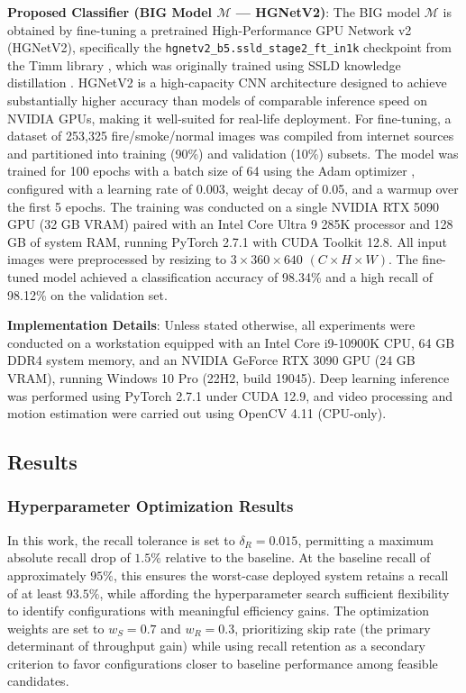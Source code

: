 \documentclass[
  10pt,
]{article}
\begin{document}
\textbf{Proposed Classifier (BIG Model \(\mathcal{M}\) --- HGNetV2)}:
The BIG model \(\mathcal{M}\) is obtained by fine-tuning a pretrained
High-Performance GPU Network v2 (HGNetV2), specifically the
\texttt{hgnetv2\_b5.ssld\_stage2\_ft\_in1k} checkpoint
 from the Timm library
, which was originally trained using
SSLD knowledge distillation .
HGNetV2  is a
high-capacity CNN architecture designed to achieve substantially higher
accuracy than models of comparable inference speed on NVIDIA GPUs,
making it well-suited for real-life deployment. For fine-tuning, a
dataset of 253,325 fire/smoke/normal images was compiled from internet
sources and partitioned into training (90\%) and validation (10\%)
subsets. The model was trained for 100 epochs with a batch size of 64
using the Adam optimizer ,
configured with a learning rate of 0.003, weight decay of 0.05, and a
warmup over the first 5 epochs. The training was conducted on a single
NVIDIA RTX 5090 GPU (32 GB VRAM) paired with an Intel Core Ultra 9 285K
processor and 128 GB of system RAM, running PyTorch 2.7.1 with CUDA
Toolkit 12.8. All input images were preprocessed by resizing to
\(3 \times 360 \times 640\) \((C \times H \times W)\). The fine-tuned
model achieved a classification accuracy of 98.34\% and a high recall of
98.12\% on the validation set.

\textbf{Implementation Details}: Unless stated otherwise, all
experiments were conducted on a workstation equipped with an Intel Core
i9-10900K CPU, 64 GB DDR4 system memory, and an NVIDIA GeForce RTX 3090
GPU (24 GB VRAM), running Windows 10 Pro (22H2, build 19045). Deep
learning inference was performed using PyTorch 2.7.1 under CUDA 12.9,
and video processing and motion estimation were carried out using OpenCV
4.11 (CPU-only).

\subsection{Results}\label{results}

\subsubsection{Hyperparameter Optimization
Results}\label{hyperparameter-optimization-results}

In this work, the recall tolerance is set to \(\delta_R = 0.015\),
permitting a maximum absolute recall drop of \(1.5\%\) relative to the
baseline. At the baseline recall of approximately \(95\%\), this ensures
the worst-case deployed system retains a recall of at least \(93.5\%\),
while affording the hyperparameter search sufficient flexibility to
identify configurations with meaningful efficiency gains. The
optimization weights are set to \(w_S = 0.7\) and \(w_R =
0.3\), prioritizing skip rate (the primary determinant of throughput
gain) while using recall retention as a secondary criterion to favor
configurations closer to baseline performance among feasible candidates.
\end{document}
